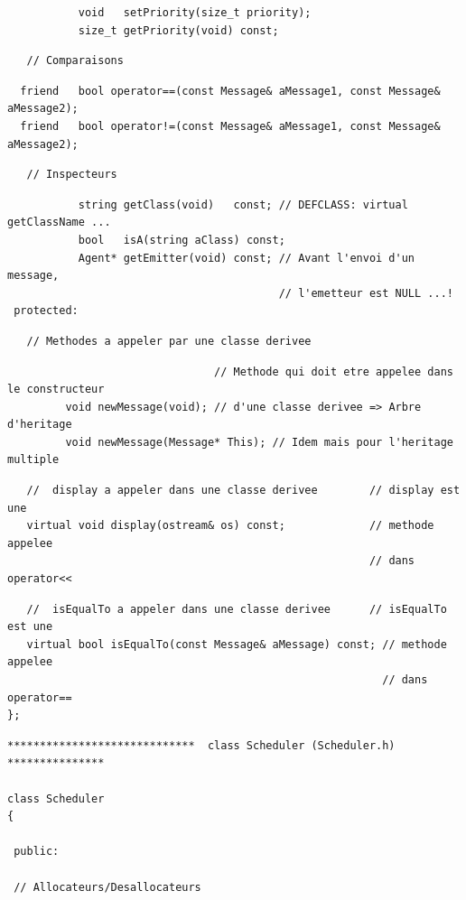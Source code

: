 \documentclass[12pt]{article}
\begin{document}
\begin{footnotesize}
\begin{verbatim}
           void   setPriority(size_t priority);
           size_t getPriority(void) const;
\end{verbatim}
\begin{verbatim}
   // Comparaisons
\end{verbatim}
\begin{verbatim}
  friend   bool operator==(const Message& aMessage1, const Message& aMessage2);
  friend   bool operator!=(const Message& aMessage1, const Message& aMessage2);
\end{verbatim}
\begin{verbatim}
   // Inspecteurs
\end{verbatim}
\begin{verbatim}
           string getClass(void)   const; // DEFCLASS: virtual getClassName ...
           bool   isA(string aClass) const;
           Agent* getEmitter(void) const; // Avant l'envoi d'un message,
                                          // l'emetteur est NULL ...!
 protected:
\end{verbatim}
\begin{verbatim}
   // Methodes a appeler par une classe derivee
\end{verbatim}
\begin{verbatim}
                                // Methode qui doit etre appelee dans le constructeur
         void newMessage(void); // d'une classe derivee => Arbre d'heritage
         void newMessage(Message* This); // Idem mais pour l'heritage multiple
\end{verbatim}
\begin{verbatim}
   //  display a appeler dans une classe derivee        // display est une
   virtual void display(ostream& os) const;             // methode appelee
                                                        // dans operator<<
\end{verbatim}
\begin{verbatim}
   //  isEqualTo a appeler dans une classe derivee      // isEqualTo est une
   virtual bool isEqualTo(const Message& aMessage) const; // methode appelee
                                                          // dans operator==
};
\end{verbatim}
\newpage
\begin{verbatim}
*****************************  class Scheduler (Scheduler.h) ***************

class Scheduler
{

 public:

 // Allocateurs/Desallocateurs


\end{verbatim}
\end{footnotesize}
\end{document}
